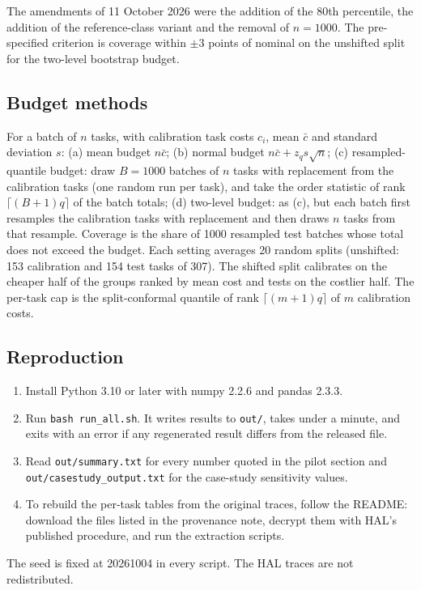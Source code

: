\documentclass[10pt]{article}
\begin{document}
The amendments of 11 October 2026 were the addition of the 80th percentile, the addition of the reference-class variant and the removal of $n=1000$. The pre-specified criterion is coverage within $\pm3$ points of nominal on the unshifted split for the two-level bootstrap budget.

\subsection{Budget methods}
For a batch of $n$ tasks, with calibration task costs $c_i$, mean $\bar c$ and standard deviation $s$:
(a) mean budget $n\bar{c}$;
(b) normal budget $n\bar{c}+z_q s\sqrt{n}$;
(c) resampled-quantile budget: draw $B=1000$ batches of $n$ tasks with replacement from the calibration tasks (one random run per task), and take the order statistic of rank $\lceil (B+1)q\rceil$ of the batch totals;
(d) two-level budget: as (c), but each batch first resamples the calibration tasks with replacement and then draws $n$ tasks from that resample.
Coverage is the share of 1000 resampled test batches whose total does not exceed the budget. Each setting averages 20 random splits (unshifted: 153 calibration and 154 test tasks of 307). The shifted split calibrates on the cheaper half of the groups ranked by mean cost and tests on the costlier half. The per-task cap is the split-conformal quantile of rank $\lceil (m+1)q\rceil$ of $m$ calibration costs.

\subsection{Reproduction}
\begin{enumerate}\itemsep0pt
\item Install Python 3.10 or later with numpy 2.2.6 and pandas 2.3.3.
\item Run \texttt{bash run\_all.sh}. It writes results to \texttt{out/}, takes under a minute, and exits with an error if any regenerated result differs from the released file.
\item Read \texttt{out/summary.txt} for every number quoted in the pilot section and \texttt{out/casestudy\_output.txt} for the case-study sensitivity values.
\item To rebuild the per-task tables from the original traces, follow the README: download the files listed in the provenance note, decrypt them with HAL's published procedure, and run the extraction scripts.
\end{enumerate}
The seed is fixed at 20261004 in every script. The HAL traces are not redistributed.
\end{document}
